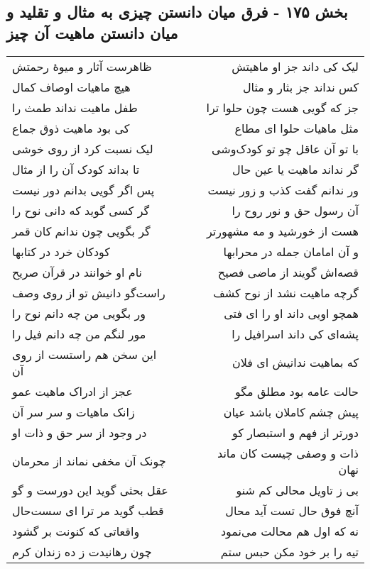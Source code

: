 \begin{center}
\section*{بخش ۱۷۵ - فرق میان دانستن چیزی به مثال و تقلید و میان دانستن ماهیت آن چیز}
\label{sec:sh175}
\begin{longtable}{l p{0.5cm} r}
ظاهرست آثار و میوهٔ رحمتش
&&
لیک کی داند جز او ماهیتش
\\
هیچ ماهیات اوصاف کمال
&&
کس نداند جز بثار و مثال
\\
طفل ماهیت نداند طمث را
&&
جز که گویی هست چون حلوا ترا
\\
کی بود ماهیت ذوق جماع
&&
مثل ماهیات حلوا ای مطاع
\\
لیک نسبت کرد از روی خوشی
&&
با تو آن عاقل چو تو کودک‌وشی
\\
تا بداند کودک آن را از مثال
&&
گر نداند ماهیت یا عین حال
\\
پس اگر گویی بدانم دور نیست
&&
ور ندانم گفت کذب و زور نیست
\\
گر کسی گوید که دانی نوح را
&&
آن رسول حق و نور روح را
\\
گر بگویی چون ندانم کان قمر
&&
هست از خورشید و مه مشهورتر
\\
کودکان خرد در کتابها
&&
و آن امامان جمله در محرابها
\\
نام او خوانند در قرآن صریح
&&
قصه‌اش گویند از ماضی فصیح
\\
راست‌گو دانیش تو از روی وصف
&&
گرچه ماهیت نشد از نوح کشف
\\
ور بگویی من چه دانم نوح را
&&
همچو اویی داند او را ای فتی
\\
مور لنگم من چه دانم فیل را
&&
پشه‌ای کی داند اسرافیل را
\\
این سخن هم راستست از روی آن
&&
که بماهیت ندانیش ای فلان
\\
عجز از ادراک ماهیت عمو
&&
حالت عامه بود مطلق مگو
\\
زانک ماهیات و سر سر آن
&&
پیش چشم کاملان باشد عیان
\\
در وجود از سر حق و ذات او
&&
دورتر از فهم و استبصار کو
\\
چونک آن مخفی نماند از محرمان
&&
ذات و وصفی چیست کان ماند نهان
\\
عقل بحثی گوید این دورست و گو
&&
بی ز تاویل محالی کم شنو
\\
قطب گوید مر ترا ای سست‌حال
&&
آنچ فوق حال تست آید محال
\\
واقعاتی که کنونت بر گشود
&&
نه که اول هم محالت می‌نمود
\\
چون رهانیدت ز ده زندان کرم
&&
تیه را بر خود مکن حبس ستم
\\
\end{longtable}
\end{center}
